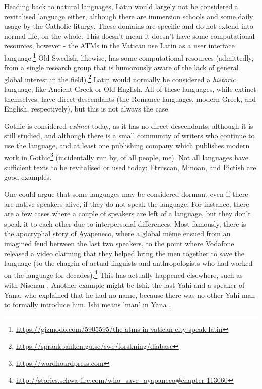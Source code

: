 Heading back to natural languages, Latin would largely not be considered a revitalised language either, although there are immersion schools and some daily usage by the Catholic liturgy. These domains are specific and do not extend into normal life, on the whole. This doesn't mean it doesn't have some computational resources, however - the ATMs in the Vatican use Latin as a user interface language.\footnote{\href{https://gizmodo.com/5905595/the-atms-in-vatican-city-speak-latin}{https://gizmodo.com/5905595/the-atms-in-vatican-city-speak-latin}} Old Swedish, likewise, has some computational resources (admittedly, from a single research group that is humorously aware of the lack of general global interest in the field).\footnote{\href{https://spraakbanken.gu.se/swe/forskning/diabase}{https://spraakbanken.gu.se/swe/forskning/diabase}} Latin would normally be considered a {\it historic} language, like Ancient Greek or Old English. All of these languages, while extinct themselves, have direct descendants (the Romance languages, modern Greek, and English, respectively), but this is not always the case.

Gothic is considered {\it extinct} today, as it has no direct descendants, although it is still studied, and although there is a small community of writers who continue to use the language, and at least one publishing company which publishes modern work in Gothic\footnote{\href{https://wordhoardpress.com}{https://wordhoardpress.com}} (incidentally run by, of all people, me). Not all languages have sufficient texts to be revitalised or used today: Etruscan, Minoan, and Pictish are good examples.

One could argue that some languages may be considered dormant even if there are native speakers alive, if they do not speak the language. For instance, there are a few cases where a couple of speakers are left of a language, but they don't speak it to each other due to interpersonal differences. Most famously, there is the apocryphal story of Ayapeneco, where a global m\^eme ensued from an imagined feud between the last two speakers, to the point where Vodafone released a video claiming that they helped bring the men together to save the language (to the chagrin of actual linguists and anthropologists who had worked on the language for decades).\footnote{\href{http://stories.schwa-fire.com/who\_save\_ayapaneco\#chapter-113060}{http://stories.schwa-fire.com/who\_save\_ayapaneco\#chapter-113060}} This has actually happened elsewhere, such as with Nisenan \citep{snyder2004practice}. Another example might be Ishi, the last Yahi and a speaker of Yana, who explained that he had no name, because there was no other Yahi man to formally introduce him. Ishi means 'man' in Yana \citep{kroeber1973ishi}.

